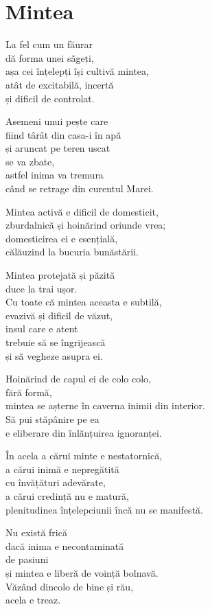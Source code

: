 
\chapter{Mintea}


La fel cum un făurar\\
dă forma unei săgeți,\\
așa cei înțelepți își cultivă mintea,\\
atât de excitabilă, incertă\\
și dificil de controlat.

Asemeni unui pește care\\
fiind târât din casa-i în apă\\
și aruncat pe teren uscat\\
se va zbate,\\
astfel inima va tremura\\
când se retrage din curentul Marei.


Mintea activă e dificil de domesticit,\\
zburdalnică și hoinărind oriunde vrea;\\
domesticirea ei e esențială,\\
călăuzind la bucuria bunăstării.


Mintea protejată și păzită\\
duce la trai ușor.\\
Cu toate că mintea aceasta e subtilă,\\
evazivă și dificil de văzut,\\
insul care e atent\\
trebuie să se îngrijească\\
și să vegheze asupra ei.


Hoinărind de capul ei de colo colo,\\
fără formă,\\
mintea se așterne în caverna inimii din interior.\\
Să pui stăpânire pe ea\\
e eliberare din înlănțuirea ignoranței.


În acela a cărui minte e nestatornică,\\
a cărui inimă e nepregătită\\
cu învățături adevărate,\\
a cărui credință nu e matură,\\
plenitudinea înțelepciunii încă nu se manifestă.


Nu există frică\\
dacă inima e necontaminată\\
de pasiuni\\
și mintea e liberă de voință bolnavă.\\
Văzând dincolo de bine și rău,\\
acela e treaz.


